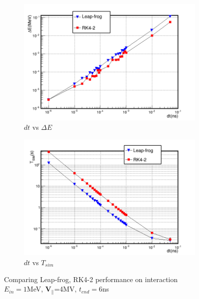 \documentclass[a4paper,oneside,12pt]{report}
\numberwithin{equation}{chapter}
\begin{document}
\begin{figure}[H]
    \captionsetup[subfigure]{justification=centering}
    \captionsetup{justification=centering}
    \centering
    \begin{subfigure}{0.9\textwidth}
        \centering
        \includegraphics[width=\linewidth]{./figures/analiz/staticE_lf_rk2_dt-E.png}
        \caption*{$dt$ vs $\Delta E$}
    \end{subfigure}
    
    \begin{subfigure}{0.9\textwidth}
        \centering
        \includegraphics[width=\linewidth]{./figures/analiz/staticE_lf_rk2_dt-Tsim.png}
        \caption*{$dt$ vs $T_{sim}$}
    \end{subfigure}
    \caption{Comparing Leap-frog, RK4-2 performance on \eE interaction\\ $E_{in}=1$MeV, $\textbf{V}_{\parallel}$=4MV, $t_{end}=6$ns}
    \label{fig:lf_rk2_par_stat_E_comparison}
\end{figure}
\end{document}
